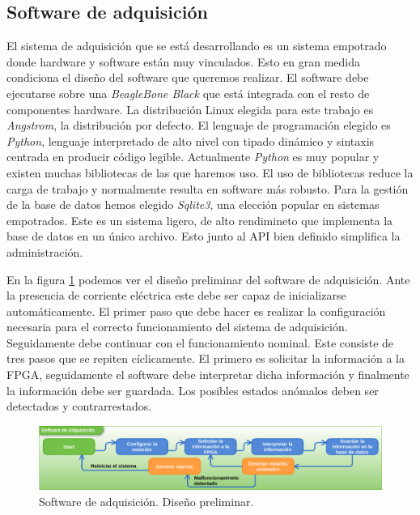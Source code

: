 	\subsection{Software de adquisición}
		El sistema de adquisición que se está desarrollando es un sistema empotrado donde hardware y software están muy vinculados. Esto en
		gran medida condiciona el diseño del software que queremos realizar. El software debe ejecutarse sobre una \emph{BeagleBone
		Black}\cite{Beagle} que está integrada con el resto de componentes hardware. La distribución Linux elegida para este trabajo es
		\emph{Angstrom}, la distribución por defecto. El lenguaje de programación elegido es \emph{Python}\cite{Python}, lenguaje interpretado de alto nivel
		con tipado dinámico y sintaxis centrada en producir código legible. Actualmente \emph{Python} es muy popular y existen muchas bibliotecas de
		las que haremos uso. El uso de bibliotecas reduce la carga de trabajo y normalmente resulta en software más robusto. Para la gestión
		de la base de datos hemos elegido \emph{Sqlite3}\cite{Sqlite}, una elección popular en sistemas empotrados. Este es un sistema ligero, de
		alto rendimineto que implementa la base de datos en un único archivo. Esto junto al API bien definido simplifica la administración.
		\par
		En la figura \ref{fig:soft_control_preliminar} podemos ver el diseño preliminar del software de adquisición. Ante la presencia de
		corriente eléctrica este debe ser capaz de inicializarse automáticamente. El primer paso que debe hacer es realizar la configuración
		necesaria para el correcto funcionamiento del sistema de adquisición. Seguidamente debe continuar con el funcionamiento nominal. Este
		consiste de tres pasos que se repiten cíclicamente. El primero es solicitar la información a la FPGA, seguidamente el software debe
		interpretar dicha información y finalmente la información debe ser guardada. Los posibles estados anómalos deben ser detectados y
		contrarrestados. 
		\begin{figure}[h]
			\centering
			\includegraphics[keepaspectratio, width=1\textwidth]{./img/soft_control_preliminar.png}
			\caption{Software de adquisición. Diseño preliminar.}
			\label{fig:soft_control_preliminar}
		\end{figure}
